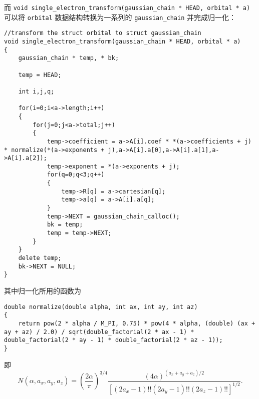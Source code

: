 \documentclass[12pt,a4paper,openany,twoside]{article}
\numberwithin{equation}{section}
\begin{document}
                而 \lstinline$void single_electron_transform(gaussian_chain * HEAD, orbital * a)$ 可以将 \lstinline$orbital$ 数据结构转换为一系列的 \lstinline$gaussian_chain$ 并完成归一化：
                \begin{lstlisting}
//transform the struct orbital to struct gaussian_chain
void single_electron_transform(gaussian_chain * HEAD, orbital * a)
{
    gaussian_chain * temp, * bk;

    temp = HEAD;

    int i,j,q;

    for(i=0;i<a->length;i++)
    {
        for(j=0;j<a->total;j++)
        {
            temp->coefficient = a->A[i].coef * *(a->coefficients + j) * normalize(*(a->exponents + j),a->A[i].a[0],a->A[i].a[1],a->A[i].a[2]);
            temp->exponent = *(a->exponents + j);
            for(q=0;q<3;q++)
            {
                temp->R[q] = a->cartesian[q];
                temp->a[q] = a->A[i].a[q];
            }
            temp->NEXT = gaussian_chain_calloc();
            bk = temp;
            temp = temp->NEXT;
        }
    }
    delete temp;
    bk->NEXT = NULL;
}
                \end{lstlisting}

                其中归一化所用的函数为
                \begin{lstlisting}
double normalize(double alpha, int ax, int ay, int az)
{
    return pow(2 * alpha / M_PI, 0.75) * pow(4 * alpha, (double) (ax + ay + az) / 2.0) / sqrt(double_factorial(2 * ax - 1) * double_factorial(2 * ay - 1) * double_factorial(2 * az - 1));
}
                \end{lstlisting}
                即
                \begin{equation}
                    N(\alpha,a_x,a_y,a_z) = \left(\frac{2 \alpha}{\pi}\right)^{3/4} \frac{(4\alpha)^{(a_x+a_y+a_z)/2}}{[(2a_x-1)!!(2a_y-1)!!(2a_z-1)!!]^{1/2}}.
                \end{equation}
                
\end{document}
